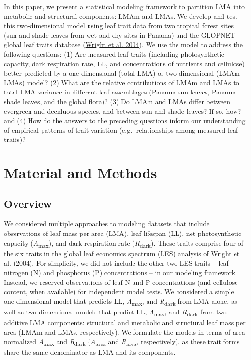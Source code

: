 \documentclass[
  12pt,
  letterpaper,
  DIV=11,
  numbers=noendperiod]{scrartcl}
\begin{document}
In this paper, we present a statistical modeling framework to partition
LMA into metabolic and structural components: LMAm and LMAs. We develop
and test this two-dimensional model using leaf trait data from two
tropical forest sites (sun and shade leaves from wet and dry sites in
Panama) and the GLOPNET global leaf traits database
(\protect\hyperlink{ref-Wright2004a}{Wright et al. 2004}). We use the
model to address the following questions: (1) Are measured leaf traits
(including photosynthetic capacity, dark respiration rate, LL, and
concentrations of nutrients and cellulose) better predicted by a
one-dimensional (total LMA) or two-dimensional (LMAm-LMAs) model? (2)
What are the relative contributions of LMAm and LMAs to total LMA
variance in different leaf assemblages (Panama sun leaves, Panama shade
leaves, and the global flora)? (3) Do LMAm and LMAs differ between
evergreen and deciduous species, and between sun and shade leaves? If
so, how? and (4) How do the answers to the preceding questions inform
our understanding of empirical patterns of trait variation (e.g.,
relationships among measured leaf traits)?

\hypertarget{material-and-methods}{%
\section{Material and Methods}\label{material-and-methods}}

\hypertarget{overview}{%
\subsection{Overview}\label{overview}}

We considered multiple approaches to modeling datasets that include
observations of leaf mass per area (LMA), leaf lifespan (LL), net
photosynthetic capacity (\emph{A}\textsubscript{max}), and dark
respiration rate (\emph{R}\textsubscript{dark}). These traits comprise
four of the six traits in the global leaf economics spectrum (LES)
analysis of Wright et al. (\protect\hyperlink{ref-Wright2004a}{2004}).
For simplicity, we did not include the other two LES traits -- leaf
nitrogen (N) and phosphorus (P) concentrations -- in our modeling
framework. Instead, we reserved observations of leaf N and P
concentrations (and cellulose content, when available) for independent
model tests. We considered a simple one-dimensional model that predicts
LL, \emph{A}\textsubscript{max}, and \emph{R}\textsubscript{dark} from
LMA alone, as well as two-dimensional models that predict LL,
\emph{A}\textsubscript{max}, and \emph{R}\textsubscript{dark} from two
additive LMA components: structural and metabolic and structural leaf
mass per area (LMAm and LMAs, respectively). We formulate the models in
terms of area-normalized \emph{A}\textsubscript{max} and
\emph{R}\textsubscript{dark} (\emph{A}\textsubscript{area} and
\emph{R}\textsubscript{area}, respectively), as these trait forms share
the same denominator as LMA and its components.
\end{document}
